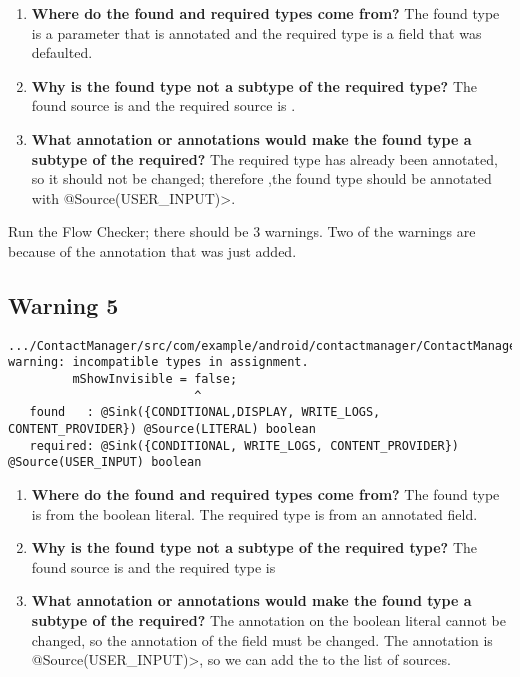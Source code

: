  \begin{enumerate}

\item\textbf{Where do the found and required types come from?}
   The found type is a parameter that is annotated and the required type is a field that was 
   defaulted.
\item  \textbf{ Why is the found type not a subtype of the required type?}
  The found source is  and the required source is . 
\item  \textbf{What annotation or annotations would make the found type a subtype of the required?}
  The required type has already been annotated, so it should not be changed; therefore ,the
  found type should be annotated with \<@Source(USER\_INPUT)>.\newline
  
  
   \end{enumerate}

Run the Flow Checker; there should be 3 warnings.  Two of the warnings are because of the
annotation that was just added.

  \subsection{Warning 5}
   \begin{Verbatim}
.../ContactManager/src/com/example/android/contactmanager/ContactManager.java:63: 
warning: incompatible types in assignment.
         mShowInvisible = false;
                          ^
   found   : @Sink({CONDITIONAL,DISPLAY, WRITE_LOGS, CONTENT_PROVIDER}) @Source(LITERAL) boolean
   required: @Sink({CONDITIONAL, WRITE_LOGS, CONTENT_PROVIDER}) @Source(USER_INPUT) boolean
    \end{Verbatim} 

 \begin{enumerate}

\item\textbf{Where do the found and required types come from?}
   The found type is from the boolean literal.  The required type is from an annotated field.
  \item\textbf{ Why is the found type not a subtype of the required type?}
  The found source is  and the required type is 
  \item\textbf{What annotation or annotations would make the found type a subtype of the required?}
  The annotation on the boolean literal cannot be changed, so the annotation of the field must be changed.  The annotation is \<@Source(USER\_INPUT)>, so we can add the 
   to the list of sources.\newline
  
      \end{enumerate}

